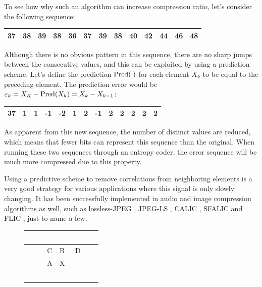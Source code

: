       To see how why such an algorithm can increase compression ratio, let's consider the following sequence:
      \begin{center}
        \begin{tabular}{|c|c|c|c|c|c|c|c|c|c|c|c|c|}
          \hline
          37 & 38 & 39 & 38 & 36 & 37 & 39 & 38 & 40 & 42 & 44 & 46 & 48 \\
          \hline
        \end{tabular}
      \end{center}
      Although there is no obvious pattern in this sequence, there are no sharp jumps between the consecutive values, and this can be exploited by using a prediction scheme. Let's define the prediction $\operatorname{Pred}(\cdot)$ for each element $X_k$ to be equal to the preceding element. The prediction error would be $\varepsilon_k = X_K - \operatorname{Pred}(X_k) = X_k - X_{k-1}$:
      \begin{center}
        \begin{tabular}{|c|c|c|c|c|c|c|c|c|c|c|c|c|}
          \hline
          37 & 1 & 1 & -1 & -2 & 1 & 2 & -1 & 2 & 2 & 2 & 2 & 2 \\
          \hline
        \end{tabular}
      \end{center}
      As apparent from this new sequence, the number of distinct values are reduced, which means that fewer bits can represent this sequence than the original. When running these two sequences through an entropy coder, the error sequence will be much more compressed due to this property.
      
      Using a predictive scheme to remove correlations from neighboring elements is a very good strategy for various applications where this signal is only slowly changing. It has been successfully implemented in audio and image compression algorithms as well, such as lossless-JPEG \cite{pennebaker_jpeg:_1992}, JPEG-LS \cite{weinberger_loco-i_2000}, CALIC \cite{wu_context-based_1997}, SFALIC \cite{starosolski_simple_2007} and FLIC \cite{wang_fast_2012}, just to name a few.
  
      \begin{figure}
        \centering
        \renewcommand{\arraystretch}{1.5}
        \begin{tabular}{|c|c|c|c|c}
          \hline
          \rowcolor{gray!25}
          \ \ \ & \ & \ & \ \ \ & \ \\ \hline
          \rowcolor{gray!25}
          \ & C & B & D & \ \\ \hline
          \cellcolor{gray!25} \ & \cellcolor{gray!25}A & \cellcolor{green!25}X & \ & \ \\ \hline
          \ & \ & \ & \ & \ \\
        \end{tabular}
        \label{fig:context}
      \end{figure}

